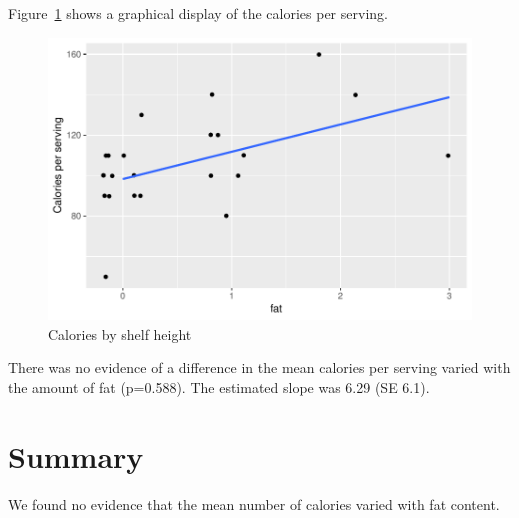\documentclass{article}\usepackage[]{graphicx}\usepackage[]{color}
\makeatletter
\def\maxwidth{ %
  \ifdim\Gin@nat@width>\linewidth
    \linewidth
  \else
    \Gin@nat@width
  \fi
}
\newenvironment{knitrout}{}{} %
\makeatother
\begin{document}
Figure~\ref{fig:scatter} shows a graphical display of the calories per serving.



\begin{figure}[h] 
\begin{center} 
\begin{knitrout}
\color{fgcolor}
\includegraphics[width=\maxwidth]{figure/unnamed-chunk-1-1} 

\end{knitrout}
\end{center}
\caption{Calories by shelf height}
\label{fig:scatter}
\end{figure}




There was no evidence  of a difference in the mean calories per serving
varied with the amount of fat (p=0.588).
The estimated slope was 
6.29 (SE
6.1).

\section{Summary}
We found no
evidence that the mean number of calories varied with fat content.
\end{document}

